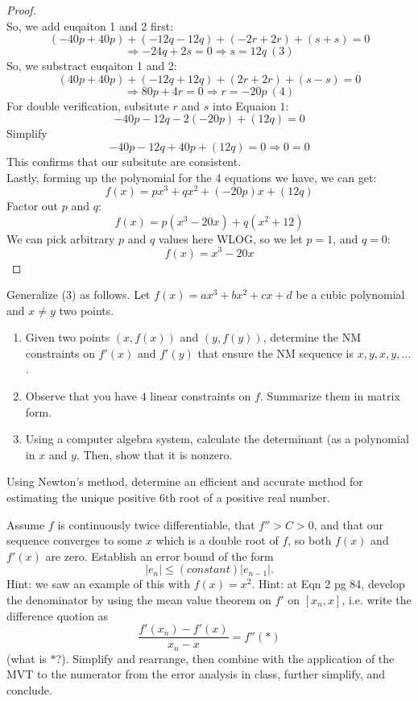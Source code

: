 \documentclass{article}
\begin{document}
\begin{proof}
    \\
    So, we add euqaiton 1 and 2 first:
    \[ (-40p + 40p) + (-12q - 12q) + (-2r + 2r) + (s + s) = 0 \]
    \[ \Rightarrow -24q + 2s = 0 \Longrightarrow s = 12q \ (3) \]
    So, we substract euqaiton 1 and 2:\
    \[ (40p + 40p) + (-12q + 12q) + (2r + 2r) + (s - s) = 0 \]
    \[ \Rightarrow 80p + 4r = 0 \Longrightarrow r = -20p \ (4) \]
    For double verification, subsitute $r$ and $s$ into Equaion $1$:
    \[ -40p - 12q - 2(-20p) + (12q) = 0 \]
    Simplify
    \[ -40p - 12q + 40p + (12q) = 0 \Longrightarrow 0 = 0 \]
    This confirms that our subsitute are consistent.
    \\
    Lastly, forming up the polynomial for the 4 equations we have, we can get:
    \[ f(x) = px^3 + qx^2 + (-20p)x + (12q) \]
    Factor out $p$ and $q$:
    \[ f(x) = p(x^3 - 20x) + q(x^2 + 12) \]
    We can pick arbitrary $p$ and $q$ values here WLOG, so we let $p = 1$, and $q = 0$:
    \[ f(x) = x^3 - 20x \]
\end{proof}

\begin{problem}
    Generalize (3) as follows. Let \(f(x) = ax^3 + bx^2 + cx +d\) be a cubic polynomial and \(x\neq y\) two points.
    \begin{enumerate}
        \item Given two points \((x,f(x))\) and \((y,f(y))\), determine the NM constraints on \(f'(x)\) and \(f'(y)\) that ensure the NM sequence is \(x,y,x,y,...\).
        \item Observe that you have \(4\) linear constraints on \(f\). Summarize them in matrix form.
        \item Using a computer algebra system, calculate the determinant (as a polynomial in \(x\) and \(y\). Then, show that it is nonzero.
    \end{enumerate}
\end{problem}

\begin{problem}
    Using Newton's method, determine an efficient and accurate method for estimating the unique positive \(6\)th root of a positive real number.
\end{problem}

\begin{problem}
     Assume \(f\) is continuously twice differentiable, that \(f'' >C>0\), and that our sequence converges to some \(x\) which is a double root of \(f\), so both \(f(x)\) and \(f'(x)\) are zero. Establish an error bound of the form
    \[|e_n| \leq (constant) |e_{n-1}|.\]
    Hint: we saw an example of this with \(f(x) = x^2\). Hint: at Eqn 2 pg 84, develop the denominator by using the mean value theorem on \(f'\) on \([x_n,x]\), i.e. write the difference quotion as
    \[\frac{f'(x_n) - f'(x)}{x_n-x} = f''(*)\]
    (what is \(*\)?). Simplify and rearrange, then combine with the application of the MVT to the numerator from the error analysis in class, further simplify, and conclude.
\end{problem}
\end{document}
